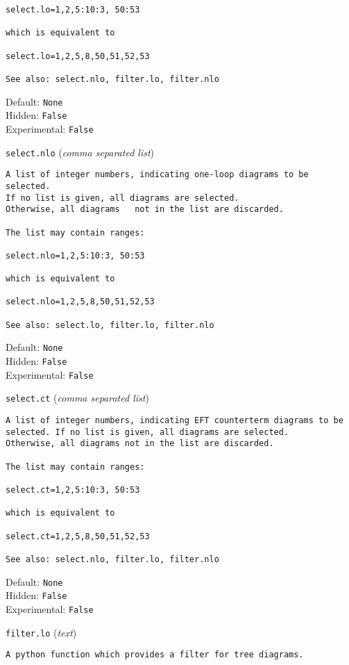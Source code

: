 \begin{basedescript}{\desclabelstyle{\pushlabel}}
\begin{verbatim}
select.lo=1,2,5:10:3, 50:53

which is equivalent to

select.lo=1,2,5,8,50,51,52,53

See also: select.nlo, filter.lo, filter.nlo
\end{verbatim}
Default: \verb|None|
\\Hidden: \verb|False|
\\Experimental: \verb|False|
\\\item[\colorbox{gray!30}{\texttt{select.nlo}}] (\textit{comma separated list})
\begin{verbatim}
A list of integer numbers, indicating one-loop diagrams to be selected.
If no list is given, all diagrams are selected.
Otherwise, all diagrams   not in the list are discarded.

The list may contain ranges:

select.nlo=1,2,5:10:3, 50:53

which is equivalent to

select.nlo=1,2,5,8,50,51,52,53

See also: select.lo, filter.lo, filter.nlo
\end{verbatim}
Default: \verb|None|
\\Hidden: \verb|False|
\\Experimental: \verb|False|
\\\item[\colorbox{gray!30}{\texttt{select.ct}}] (\textit{comma separated list})
\begin{verbatim}
A list of integer numbers, indicating EFT counterterm diagrams to be
selected. If no list is given, all diagrams are selected.
Otherwise, all diagrams not in the list are discarded.

The list may contain ranges:

select.ct=1,2,5:10:3, 50:53

which is equivalent to

select.ct=1,2,5,8,50,51,52,53

See also: select.nlo, filter.lo, filter.nlo
\end{verbatim}
Default: \verb|None|
\\Hidden: \verb|False|
\\Experimental: \verb|False|
\\\item[\colorbox{gray!30}{\texttt{filter.lo}}] (\textit{text})
\begin{verbatim}
A python function which provides a filter for tree diagrams.


\end{verbatim}
\end{basedescript}
